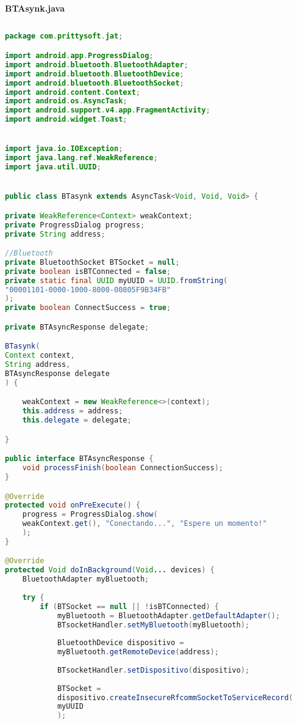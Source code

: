 \pagestyle{plain}
\centering\textbf{BTAsynk.java}

\begin{lstlisting}[language=java, caption={Clase BTAsynk, para conexiónes con dispositivos bluetooth}, captionpos=b, basicstyle=\small]
	
package com.prittysoft.jat;

import android.app.ProgressDialog;
import android.bluetooth.BluetoothAdapter;
import android.bluetooth.BluetoothDevice;
import android.bluetooth.BluetoothSocket;
import android.content.Context;
import android.os.AsyncTask;
import android.support.v4.app.FragmentActivity;
import android.widget.Toast;


import java.io.IOException;
import java.lang.ref.WeakReference;
import java.util.UUID;


public class BTasynk extends AsyncTask<Void, Void, Void> {

private WeakReference<Context> weakContext;
private ProgressDialog progress;
private String address;

//Bluetooth
private BluetoothSocket BTSocket = null;
private boolean isBTConnected = false;
private static final UUID myUUID = UUID.fromString(
"00001101-0000-1000-8000-00805F9B34FB"
);
private boolean ConnectSuccess = true;

private BTAsyncResponse delegate;

BTasynk(
Context context, 
String address, 
BTAsyncResponse delegate
) {

	weakContext = new WeakReference<>(context);
	this.address = address;
	this.delegate = delegate;

}

public interface BTAsyncResponse {
	void processFinish(boolean ConnectionSuccess);
}

@Override
protected void onPreExecute() {
	progress = ProgressDialog.show(
	weakContext.get(), "Conectando...", "Espere un momento!"
	);
}

@Override
protected Void doInBackground(Void... devices) {
	BluetoothAdapter myBluetooth;
	
	try {
		if (BTSocket == null || !isBTConnected) {
			myBluetooth = BluetoothAdapter.getDefaultAdapter();
			BTsocketHandler.setMyBluetooth(myBluetooth);
			
			BluetoothDevice dispositivo = 
			myBluetooth.getRemoteDevice(address);
			
			BTsocketHandler.setDispositivo(dispositivo);
			
			BTSocket = 
			dispositivo.createInsecureRfcommSocketToServiceRecord(
			myUUID
			);
			

\end{lstlisting}
